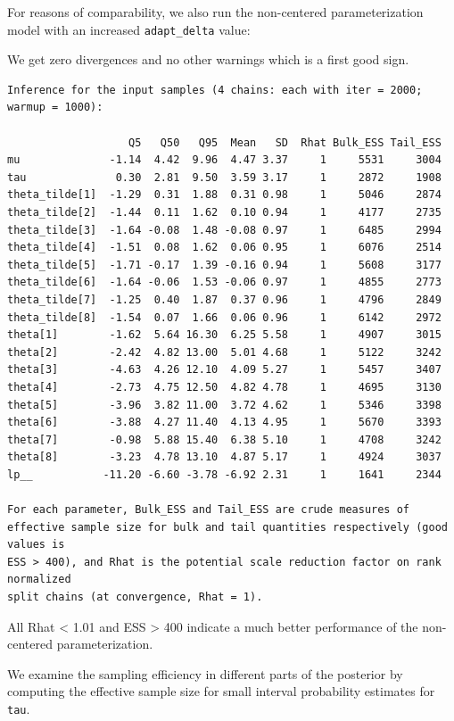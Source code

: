 \documentclass[american,]{article}
\begin{document}
For reasons of comparability, we also run the non-centered
parameterization model with an increased \texttt{adapt\_delta} value:

We get zero divergences and no other warnings which is a first good
sign.

\begin{verbatim}
Inference for the input samples (4 chains: each with iter = 2000; warmup = 1000):

                   Q5   Q50   Q95  Mean   SD  Rhat Bulk_ESS Tail_ESS
mu              -1.14  4.42  9.96  4.47 3.37     1     5531     3004
tau              0.30  2.81  9.50  3.59 3.17     1     2872     1908
theta_tilde[1]  -1.29  0.31  1.88  0.31 0.98     1     5046     2874
theta_tilde[2]  -1.44  0.11  1.62  0.10 0.94     1     4177     2735
theta_tilde[3]  -1.64 -0.08  1.48 -0.08 0.97     1     6485     2994
theta_tilde[4]  -1.51  0.08  1.62  0.06 0.95     1     6076     2514
theta_tilde[5]  -1.71 -0.17  1.39 -0.16 0.94     1     5608     3177
theta_tilde[6]  -1.64 -0.06  1.53 -0.06 0.97     1     4855     2773
theta_tilde[7]  -1.25  0.40  1.87  0.37 0.96     1     4796     2849
theta_tilde[8]  -1.54  0.07  1.66  0.06 0.96     1     6142     2972
theta[1]        -1.62  5.64 16.30  6.25 5.58     1     4907     3015
theta[2]        -2.42  4.82 13.00  5.01 4.68     1     5122     3242
theta[3]        -4.63  4.26 12.10  4.09 5.27     1     5457     3407
theta[4]        -2.73  4.75 12.50  4.82 4.78     1     4695     3130
theta[5]        -3.96  3.82 11.00  3.72 4.62     1     5346     3398
theta[6]        -3.88  4.27 11.40  4.13 4.95     1     5670     3393
theta[7]        -0.98  5.88 15.40  6.38 5.10     1     4708     3242
theta[8]        -3.23  4.78 13.10  4.87 5.17     1     4924     3037
lp__           -11.20 -6.60 -3.78 -6.92 2.31     1     1641     2344

For each parameter, Bulk_ESS and Tail_ESS are crude measures of 
effective sample size for bulk and tail quantities respectively (good values is 
ESS > 400), and Rhat is the potential scale reduction factor on rank normalized
split chains (at convergence, Rhat = 1).
\end{verbatim}

All Rhat \textless{} 1.01 and ESS \textgreater{} 400 indicate a much
better performance of the non-centered parameterization.

We examine the sampling efficiency in different parts of the posterior
by computing the effective sample size for small interval probability
estimates for \texttt{tau}.
\end{document}
